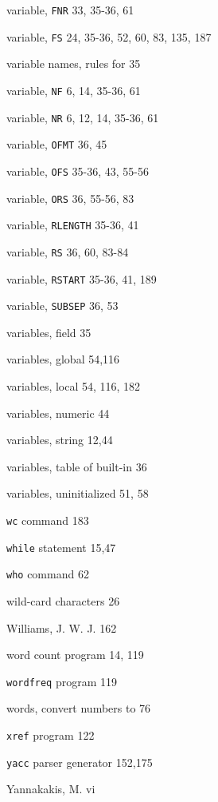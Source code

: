 \begin{multicols}{3}
\hangindent=3pc  variable, \verb'FNR' 33, 35-36, 61

\hangindent=3pc  variable, \verb'FS' 24, 35-36, 52, 60, 83, 135, 187

\hangindent=3pc  variable names, rules for 35

\hangindent=3pc  variable, \verb'NF' 6, 14, 35-36, 61

\hangindent=3pc  variable, \verb'NR' 6, 12, 14, 35-36, 61

\hangindent=3pc  variable, \verb'OFMT' 36, 45

\hangindent=3pc  variable, \verb'OFS' 35-36, 43, 55-56

\hangindent=3pc  variable, \verb'ORS' 36, 55-56, 83

\hangindent=3pc  variable, \verb'RLENGTH' 35-36, 41

\hangindent=3pc  variable, \verb'RS' 36, 60, 83-84

\hangindent=3pc  variable, \verb'RSTART' 35-36, 41, 189

\hangindent=3pc  variable, \verb'SUBSEP' 36, 53

\hangindent=3pc  variables, field 35

\hangindent=3pc  variables, global 54,116

\hangindent=3pc  variables, local 54, 116, 182

\hangindent=3pc  variables, numeric 44

\hangindent=3pc  variables, string 12,44

\hangindent=3pc  variables, table of built-in 36

\hangindent=3pc  variables, uninitialized 51, 58

\hangindent=3pc  \verb'wc' command 183

\hangindent=3pc  \verb'while' statement 15,47

\hangindent=3pc  \verb'who' command 62

\hangindent=3pc  wild-card characters 26

\hangindent=3pc  Williams, J. W. J. 162

\hangindent=3pc  word count program 14, 119

\hangindent=3pc  \verb'wordfreq' program 119

\hangindent=3pc  words, convert numbers to 76

\hangindent=3pc  \verb'xref' program 122

\hangindent=3pc  \verb'yacc' parser generator 152,175

\hangindent=3pc  Yannakakis, M. vi

\end{multicols}
